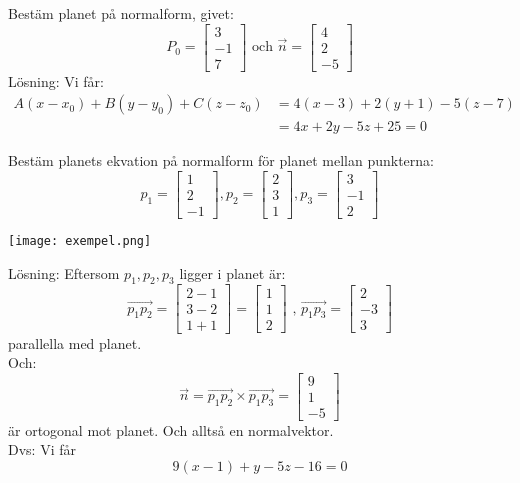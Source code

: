 \begin{Ex}
    Bestäm planet på normalform, givet:
    \[
        P_0 = \begin{bmatrix} 3\\-1\\7 \end{bmatrix} \mbox{ och } \vec{n} = \begin{bmatrix} 4\\2\\-5 \end{bmatrix}
    \]
    Lösning: Vi får:
    \begin{align*}
    A(x-x_0) + B(y-y_0) + C(z-z_0) &= 4(x-3) + 2(y+1) -5(z-7)\\&= 4x + 2y -5z + 25 = 0
    \end{align*}
\end{Ex}
\begin{Ex}
    Bestäm planets ekvation på normalform för planet mellan punkterna:
    \[
        p_1 = \begin{bmatrix} 1\\2\\-1 \end{bmatrix}, p_2 = \begin{bmatrix} 2\\3\\1 \end{bmatrix}, p_3 = \begin{bmatrix} 3\\-1\\2 \end{bmatrix}
    \]
    \begin{center}
        \texttt{[image: exempel.png]}
    \end{center}
    Lösning: Eftersom $p_1, p_2, p_3$ ligger i planet är:
    \[
        \overrightarrow{p_1p_2} = \begin{bmatrix} 2-1\\3-2\\1+1 \end{bmatrix} = \begin{bmatrix} 1\\1\\2 \end{bmatrix} \mbox{ , } \overrightarrow{p_1p_3} = \begin{bmatrix} 2\\-3\\3 \end{bmatrix}
    \]
    parallella med planet.\\
    Och:
    \[
        \vec{n} = \overrightarrow{p_1p_2} \times \overrightarrow{p_1p_3} = \begin{bmatrix} 9\\1\\-5 \end{bmatrix}
    \]
    är ortogonal mot planet. Och alltså en normalvektor.\\
    Dvs: Vi får
    \[
        9(x-1) + y -5z - 16 = 0
    \]
\end{Ex}
